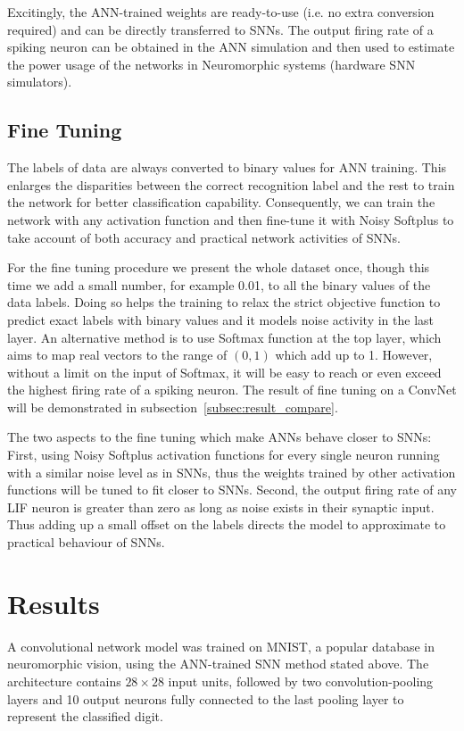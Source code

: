 \documentclass{article}
\begin{document}
Excitingly, the ANN-trained weights are ready-to-use (i.e. no extra conversion required) and can be directly transferred to SNNs. The output firing rate of a spiking neuron can be obtained in the ANN simulation and then used to estimate the power usage of the networks in Neuromorphic systems (hardware SNN simulators).



\subsection{Fine Tuning}
The labels of data are always converted to binary values for ANN training.
This enlarges the disparities between the correct recognition label and the rest to train the network for better classification capability.
Consequently, we can train the network with any activation function and then fine-tune it with Noisy Softplus to take account of both accuracy and practical network activities of SNNs.


For the fine tuning procedure we present the whole dataset once, though this time we add a small number, for example 0.01, to all the binary values of the data labels.
Doing so helps the training to relax the strict objective function to predict exact labels with binary values and it models noise activity in the last layer.
An alternative method is to use Softmax function at the top layer, which aims to map real vectors to the range of $(0,1)$ which add up to 1. 
However, without a limit on the input of Softmax, it will be easy to reach or even exceed the highest firing rate of a spiking neuron.
The result of fine tuning on a ConvNet will be demonstrated in subsection~\ref{subsec:result_compare}.

The two aspects to the fine tuning which make ANNs behave closer to SNNs:
First, using Noisy Softplus activation functions for every single neuron running with a similar noise level as in SNNs, thus the weights trained by other activation functions will be tuned to fit closer to SNNs.
Second, the output firing rate of any LIF neuron is greater than zero as long as noise exists in their synaptic input. Thus adding up a small offset on the labels directs the model to approximate to practical behaviour of SNNs. 

\section{Results}
\label{sec:result}
A convolutional network model was trained on MNIST,
a popular database in neuromorphic vision, using the ANN-trained SNN method stated above.
The architecture contains $28\times28$ input units, followed by two convolution-pooling layers and 10 output neurons fully connected to the last pooling layer to represent the classified digit.
\end{document}

